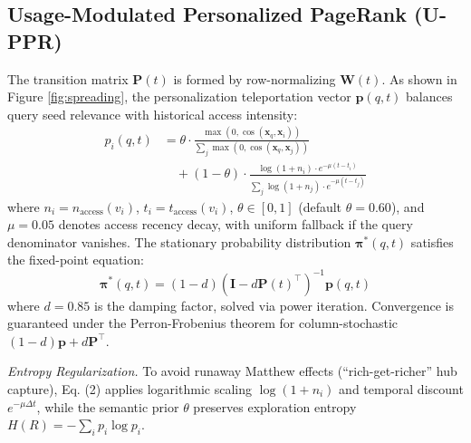 \documentclass[conference]{IEEEtran}
\begin{document}
\subsection{Usage-Modulated Personalized PageRank (U-PPR)}
The transition matrix $\mathbf{P}(t)$ is formed by row-normalizing $\mathbf{W}(t)$. As shown in Figure \ref{fig:spreading}, the personalization teleportation vector $\mathbf{p}(q, t)$ balances query seed relevance with historical access intensity:
\begin{equation}
\begin{aligned}
p_i(q, t) &= \theta \cdot \frac{\max\left(0, \cos(\mathbf{x}_q, \mathbf{x}_i)\right)}{\sum_j \max\left(0, \cos(\mathbf{x}_q, \mathbf{x}_j)\right)} \\
&\quad + (1 - \theta) \cdot \frac{\log(1 + n_i) \cdot e^{-\mu(t - t_i)}}{\sum_j \log(1 + n_j) \cdot e^{-\mu(t - t_j)}}
\end{aligned}
\end{equation}
where $n_i = n_{\text{access}}(v_i)$, $t_i = t_{\text{access}}(v_i)$, $\theta \in [0, 1]$ (default $\theta = 0.60$), and $\mu = 0.05$ denotes access recency decay, with uniform fallback if the query denominator vanishes. The stationary probability distribution $\mathbf{\pi}^*(q, t)$ satisfies the fixed-point equation:
\begin{equation}
\mathbf{\pi}^*(q, t) = (1 - d)\left(\mathbf{I} - d \mathbf{P}(t)^\top\right)^{-1} \mathbf{p}(q, t)
\end{equation}
where $d = 0.85$ is the damping factor, solved via power iteration. Convergence is guaranteed under the Perron-Frobenius theorem for column-stochastic $(1 - d)\mathbf{p} + d \mathbf{P}^\top$.

\textit{Entropy Regularization.} To avoid runaway Matthew effects (``rich-get-richer'' hub capture), Eq. (2) applies logarithmic scaling $\log(1 + n_i)$ and temporal discount $e^{-\mu \Delta t}$, while the semantic prior $\theta$ preserves exploration entropy $H(R) = -\sum_i p_i \log p_i$.
\end{document}
